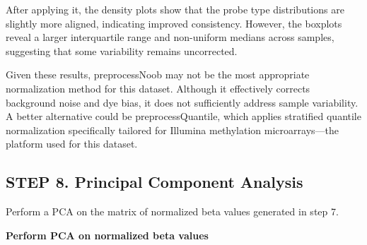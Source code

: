 \documentclass[
  11pt,
]{article}
\newenvironment{Shaded}{\begin{snugshade}}{\end{snugshade}}
\newcommand{\AttributeTok}[1]{\textcolor[rgb]{0.13,0.29,0.53}{#1}}
\newcommand{\ConstantTok}[1]{\textcolor[rgb]{0.56,0.35,0.01}{#1}}
\newcommand{\DecValTok}[1]{\textcolor[rgb]{0.00,0.00,0.81}{#1}}
\newcommand{\FunctionTok}[1]{\textcolor[rgb]{0.13,0.29,0.53}{\textbf{#1}}}
\newcommand{\NormalTok}[1]{#1}
\newcommand{\OtherTok}[1]{\textcolor[rgb]{0.56,0.35,0.01}{#1}}
\newcommand{\SpecialCharTok}[1]{\textcolor[rgb]{0.81,0.36,0.00}{\textbf{#1}}}
\newcommand{\StringTok}[1]{\textcolor[rgb]{0.31,0.60,0.02}{#1}}
\begin{document}
After applying it, the density plots show that the probe type
distributions are slightly more aligned, indicating improved
consistency. However, the boxplots reveal a larger interquartile range
and non-uniform medians across samples, suggesting that some variability
remains uncorrected.

Given these results, preprocessNoob may not be the most appropriate
normalization method for this dataset. Although it effectively corrects
background noise and dye bias, it does not sufficiently address sample
variability. A better alternative could be preprocessQuantile, which
applies stratified quantile normalization specifically tailored for
Illumina methylation microarrays---the platform used for this dataset.

\subsection{STEP 8. Principal Component
Analysis}\label{step-8.-principal-component-analysis}

Perform a PCA on the matrix of normalized beta values generated in step
7.

\textbf{Perform PCA on normalized beta values}

\begin{Shaded}
\end{Shaded}
\end{document}
